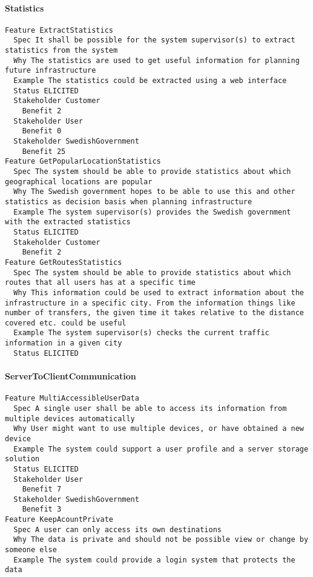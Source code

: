 \begin{lstlisting}

\end{lstlisting}


       \paragraph{Statistics}


\begin{lstlisting}
Feature ExtractStatistics
  Spec It shall be possible for the system supervisor(s) to extract statistics from the system
  Why The statistics are used to get useful information for planning future infrastructure
  Example The statistics could be extracted using a web interface
  Status ELICITED
  Stakeholder Customer
    Benefit 2
  Stakeholder User
    Benefit 0
  Stakeholder SwedishGovernment
    Benefit 25
Feature GetPopularLocationStatistics
  Spec The system should be able to provide statistics about which geographical locations are popular
  Why The Swedish government hopes to be able to use this and other statistics as decision basis when planning infrastructure
  Example The system supervisor(s) provides the Swedish government with the extracted statistics
  Status ELICITED
  Stakeholder Customer
    Benefit 2
Feature GetRoutesStatistics
  Spec The system should be able to provide statistics about which routes that all users has at a specific time
  Why This information could be used to extract information about the infrastructure in a specific city. From the information things like number of transfers, the given time it takes relative to the distance covered etc. could be useful
  Example The system supervisor(s) checks the current traffic information in a given city
  Status ELICITED

\end{lstlisting}
    
        
       \paragraph{ServerToClientCommunication}


\begin{lstlisting}
Feature MultiAccessibleUserData
  Spec A single user shall be able to access its information from multiple devices automatically
  Why User might want to use multiple devices, or have obtained a new device
  Example The system could support a user profile and a server storage solution
  Status ELICITED
  Stakeholder User
    Benefit 7
  Stakeholder SwedishGovernment
    Benefit 3
Feature KeepAcountPrivate
  Spec A user can only access its own destinations
  Why The data is private and should not be possible view or change by someone else
  Example The system could provide a login system that protects the data

\end{lstlisting}
    
